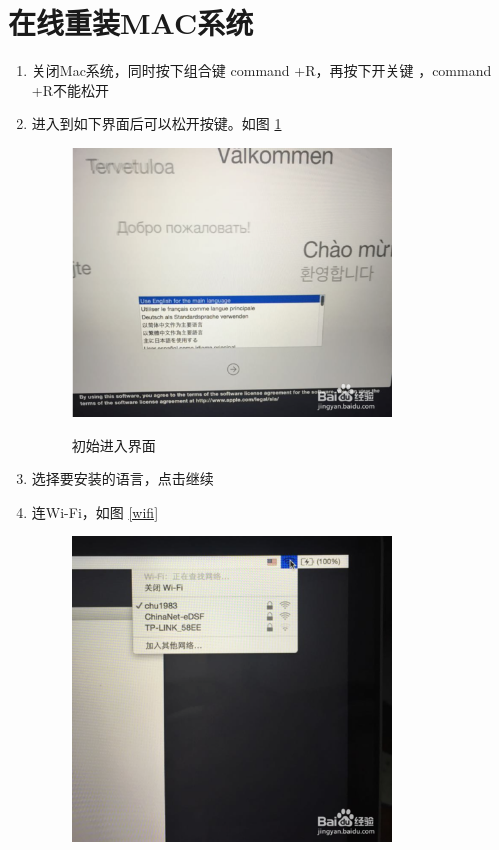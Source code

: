 \documentclass{article}
\begin{document}
\section{在线重装MAC系统}
\begin{enumerate}
\item 关闭Mac系统，同时按下组合键 command +R，再按下开关键 ，command +R不能松开
\item 进入到如下界面后可以松开按键。如图 \ref{chushi} \par
  \begin{figure}[!htb] %
  \centering
  \includegraphics[width=0.8\textwidth]{figures/chushi.jpg}
  \label{chushi}
   \caption{初始进入界面}
   \end{figure}
\item 选择要安装的语言，点击继续
\item 连Wi-Fi，如图 \ref{wifi}
  \begin{figure}[!htb] %
  \centering
  \includegraphics[width=0.8\textwidth]{figures/wifi.jpg}

\end{figure}
\end{enumerate}
\end{document}
